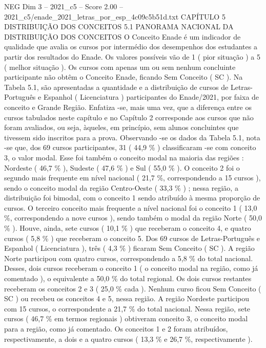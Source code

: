 \begin{textsample}{NEG Dim 3 – 2021\_c5 – Score 2.00 – 2021\_c5/enade\_2021\_letras\_por\_esp\_4c09c5b51d.txt}  \label{ex:f3_neg_201}
CAPÍTULO 5 DISTRIBUIÇÃO DOS CONCEITOS 5.1 PANORAMA NACIONAL DA DISTRIBUIÇÃO DOS CONCEITOS O Conceito Enade é um indicador de qualidade que avalia os cursos por intermédio dos desempenhos dos estudantes a partir dos resultados do Enade.
Os valores possíveis vão de 1 ( pior situação ) a 5 ( melhor situação ).
Os cursos com apenas um ou sem nenhum concluinte participante não obtêm o Conceito Enade, ficando Sem Conceito ( SC ).
Na Tabela 5.1, são apresentadas a quantidade e a distribuição de cursos de Letras-Português e Espanhol ( Licenciatura ) participantes do Enade/2021, por faixa de conceito e Grande Região.
Enfatiza -se, mais uma vez, que a diferença entre os cursos tabulados neste capítulo e no Capítulo 2 corresponde aos cursos que não foram avaliados, ou seja, àqueles, em princípio, sem alunos concluintes que tivessem sido inscritos para a prova.
Observando -se os dados da Tabela 5.1, nota -se que, dos 69 cursos participantes, 31 ( 44,9 \% ) classificaram -se com conceito 3, o valor modal.
Esse foi também o conceito modal na maioria das regiões : Nordeste ( 46,7 \% ), Sudeste ( 47,6 \% ) e Sul ( 55,0 \% ).
O conceito 2 foi o segundo mais frequente em nível nacional ( 21,7 \%, correspondendo a 15 cursos ), sendo o conceito modal da região Centro-Oeste ( 33,3 \% ) ; nessa região, a distribuição foi bimodal, com o conceito 1 sendo atribuído à mesma proporção de cursos.
O terceiro conceito mais frequente a nível nacional foi o conceito 1 ( 13,0 \%, correspondendo a nove cursos ), sendo também o modal da região Norte ( 50,0 \% ).
Houve, ainda, sete cursos ( 10,1 \% ) que receberam o conceito 4, e quatro cursos ( 5,8 \% ) que receberam o conceito 5.
Dos 69 cursos de Letras-Português e Espanhol ( Licenciatura ), três ( 4,3 \% ) ficaram Sem Conceito ( SC ).
A região Norte participou com quatro cursos, correspondendo a 5,8 \% do total nacional.
Desses, dois cursos receberam o conceito 1 ( o conceito modal na região, como já comentado ), o equivalente a 50,0 \% do total regional.
Os dois cursos restantes receberam os conceitos 2 e 3 ( 25,0 \% cada ).
Nenhum curso ficou Sem Conceito ( SC ) ou recebeu os conceitos 4 e 5, nessa região.
A região Nordeste participou com 15 cursos, o correspondente a 21,7 \% do total nacional.
Nessa região, sete cursos ( 46,7 \% em termos regionais ) obtiveram conceito 3, o conceito modal para a região, como já comentado.
Os conceitos 1 e 2 foram atribuídos, respectivamente, a dois e a quatro cursos ( 13,3 \% e 26,7 \%, respectivamente ).

\end{textsample}
